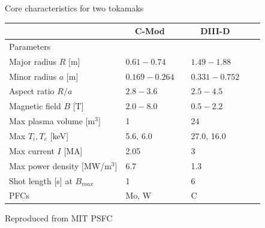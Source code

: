 \documentclass{beamer}
\begin{document}
\begin{frame}{Core characteristics for two tokamaks}
\begin{table}\centering
\begin{tabular}{@{}llclcl@{}}\toprule[2 pt]
&\multicolumn{1}{c}{C-Mod} & \phantom{abc} & \multicolumn{1}{c}{DIII-D}  \\
\midrule
\phantom{a}Parameters & &&  \\
\phantom{a}Major radius $R$ [m] 	&	$0.61 - 0.74$	&&	$1.49-1.88$		  	\\
\phantom{a}Minor radius $a$ [m] 	&	$0.169-0.264$	&& 	$0.331-0.752$	          	\\
\phantom{a}Aspect ratio	$R/a$           &       $2.8-3.6$	&&	$2.5-4.5$        	  	\\
\phantom{a}Magnetic field $B$ [T]       &       $2.0-8.0$	&&	$0.5-2.2$                       \\
\phantom{a}Max plasma volume [$\text{m}^3$]	&	1	&&	24			  	\\
\phantom{a}Max  $T_i, T_e$ [keV]	&	5.6, 6.0	&&	27.0, 16.0		  	\\
\phantom{a}Max current $I$ [MA]         &	2.05	        &&	3			  	\\
\phantom{a}Max power density [MW/$\text{m}^3$]	& 6.7    	&&	1.3			  	\\
\phantom{a}Shot length [s] at $B_{max}$  &	1	        &&	6			  	\\
\phantom{a}PFCs	                        &	Mo, W	        &&	C			  	\\
\bottomrule[2 pt]
\end{tabular}
\label{tbl:tokamak_params_juxtaposition}
\end{table}

\tiny{Reproduced from MIT PSFC}

\end{frame}

\end{document}

